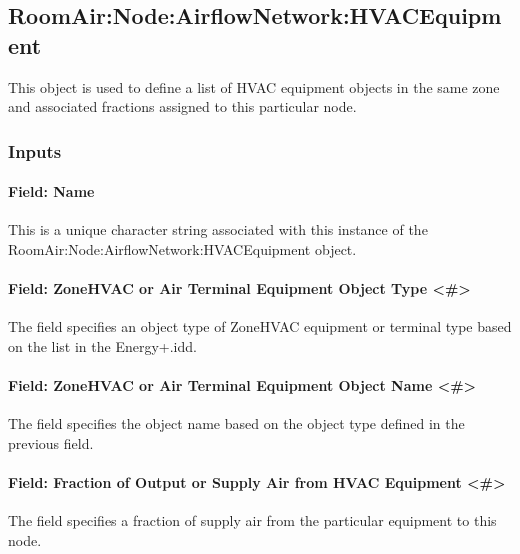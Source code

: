 \subsection{RoomAir:Node:AirflowNetwork:HVACEquipment}\label{roomairnodeairflownetworkhvacequipment}

This object is used to define a list of HVAC equipment objects in the same zone and associated fractions assigned to this particular node.

\subsubsection{Inputs}\label{inputs-15-012}

\paragraph{Field: Name}\label{field-name-11-012}

This is a unique character string associated with this instance of the Room\-Air:\-Node:\-Air\-flow\-Net\-work:\-HVAC\-Equipment object.

\paragraph{Field: ZoneHVAC or Air Terminal Equipment Object Type \textless{}\#\textgreater{}}\label{field-zonehvac-or-air-terminal-equipment-object-type-x}

The field specifies an object type of ZoneHVAC equipment or terminal type based on the list in the Energy+.idd.

\paragraph{Field: ZoneHVAC or Air Terminal Equipment Object Name \textless{}\#\textgreater{}}\label{field-zonehvac-or-air-terminal-equipment-object-name-x}

The field specifies the object name based on the object type defined in the previous field.

\paragraph{Field: Fraction of Output or Supply Air from HVAC Equipment \textless{}\#\textgreater{}}\label{field-fraction-of-output-or-supply-air-from-hvac-equipment-x}

The field specifies a fraction of supply air from the particular equipment to this node.

